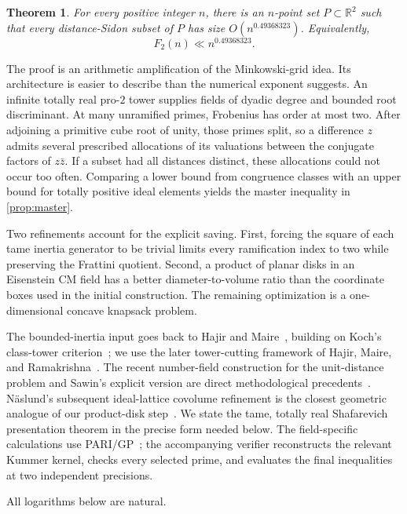 \documentclass[11pt]{article}
\newtheorem{theorem}{Theorem}[section]
\theoremstyle{definition}
\theoremstyle{remark}
\newcommand{\R}{\mathbb R}
\begin{document}
\begin{theorem}\label{thm:main}
For every positive integer $n$, there is an $n$-point set
$P\subset\R^2$ such that every distance-Sidon subset of $P$ has size
$O(n^{0.49368323})$.  Equivalently,
\[
 F_2(n)\ll n^{0.49368323}.
\]
\end{theorem}

The proof is an arithmetic amplification of the Minkowski-grid idea.  Its
architecture is easier to describe than the numerical exponent suggests.
An infinite totally real pro-$2$ tower supplies fields of dyadic degree and
bounded root discriminant.  At many unramified primes, Frobenius has order
at most two.  After adjoining a primitive cube root of unity, those primes
split, so a difference $z$ admits several prescribed allocations of its
valuations between the conjugate factors of $z\bar z$.  If a subset had all
distances distinct, these allocations could not occur too often.  Comparing
a lower bound from congruence classes with an upper bound for totally
positive ideal elements yields the master inequality in
\cref{prop:master}.

Two refinements account for the explicit saving.  First, forcing the square
of each tame inertia generator to be trivial limits every ramification
index to two while preserving the Frattini quotient.  Second, a product of
planar disks in an Eisenstein CM field has a better diameter-to-volume ratio
than the coordinate boxes used in the initial construction.  The remaining
optimization is a one-dimensional concave knapsack problem.

The bounded-inertia input goes back to Hajir and
Maire~\cite{HajirMaire2001,HajirMaire2002}, building on Koch's class-tower
criterion~\cite{Hajir1996,Koch2002}; we use the later tower-cutting framework
of Hajir, Maire, and Ramakrishna~\cite{HajirMaireRamakrishna2021}.  The recent
number-field construction for the unit-distance problem and Sawin's explicit
version are direct methodological precedents~\cite{AlonEtAl2026,Sawin2026}.
N\"aslund's subsequent ideal-lattice covolume refinement is the closest
geometric analogue of our product-disk step~\cite{Naslund2026}.  We state the
tame, totally real Shafarevich presentation theorem in the precise form
needed below.  The field-specific calculations use PARI/GP~\cite{PARI2}; the
accompanying verifier reconstructs the relevant Kummer kernel, checks every
selected prime, and evaluates the final inequalities at two independent
precisions.

All logarithms below are natural.
\end{document}
